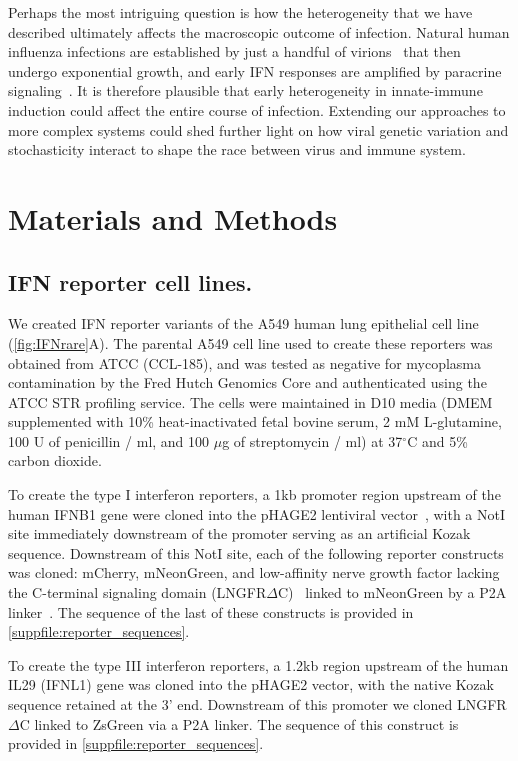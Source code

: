 \documentclass[]{asm-article}
\newcommand{\FIG}[1]{\autoref{fig:#1}}
\newcommand{\SUPPFILE}[1]{\autoref{suppfile:#1}}
\begin{document}
Perhaps the most intriguing question is how the heterogeneity that we have described ultimately affects the macroscopic outcome of infection.
Natural human influenza infections are established by just a handful of virions~\cite{mccrone2018stochastic, xue2018reconciling, varble2014influenza} that then undergo exponential growth, and early IFN responses are amplified by paracrine signaling~\cite{stetson2006type,honda2006type}.
It is therefore plausible that early heterogeneity in innate-immune induction could affect the entire course of infection.
Extending our approaches to more complex systems could shed further light on how viral genetic variation and stochasticity interact to shape the race between virus and immune system.


\section{Materials and Methods}
\small
\subsection{IFN reporter cell lines.}
We created IFN reporter variants of the A549 human lung epithelial cell line (\FIG{IFNrare}A).
The parental A549 cell line used to create these reporters was obtained from ATCC (CCL-185), and was tested as negative for mycoplasma contamination by the Fred Hutch Genomics Core and authenticated using the ATCC STR profiling service.
The cells were maintained in D10 media (DMEM supplemented with 10\% heat-inactivated fetal bovine serum, 2 mM L-glutamine, 100 U of penicillin / ml, and 100 $\mu$g of streptomycin / ml) at 37$^{\circ}$C and 5\% carbon dioxide.

To create the type I interferon reporters, a 1kb promoter region upstream of the human IFNB1 gene were cloned into the pHAGE2 lentiviral vector~\cite{oconnell2010lentiviral}, with a NotI site immediately downstream of the promoter serving as an artificial Kozak sequence. 
Downstream of this NotI site, each of the following reporter constructs was cloned: mCherry, mNeonGreen, and low-affinity nerve growth factor lacking the C-terminal signaling domain (LNGFR$\Delta$C)~\cite{bonini1997hsv,ruggieri1997cell} linked to mNeonGreen by a P2A linker~\cite{kim2011high}.
The sequence of the last of these constructs is provided in \SUPPFILE{reporter_sequences}.

To create the type III interferon reporters, a 1.2kb region upstream of the human IL29 (IFNL1) gene was cloned into the pHAGE2 vector, with the native Kozak sequence retained at the 3' end. 
Downstream of this promoter we cloned LNGFR$\Delta$C linked to ZsGreen via a P2A linker.
The sequence of this construct is provided in \SUPPFILE{reporter_sequences}.
 
\end{document}
